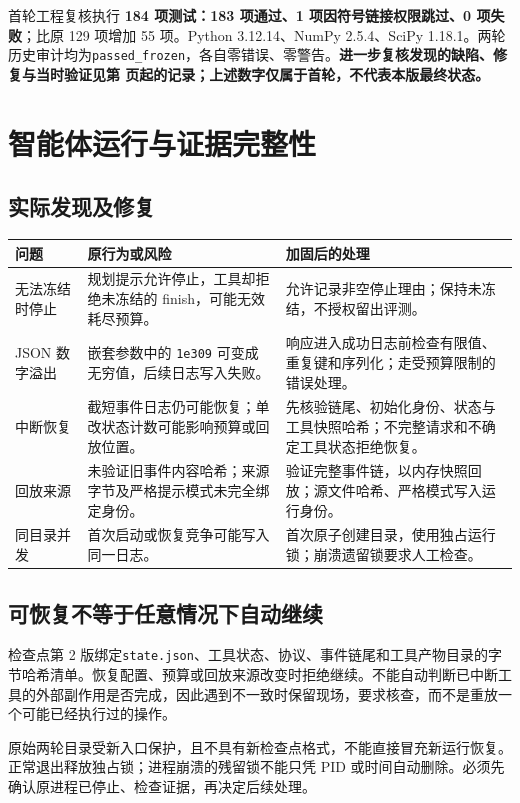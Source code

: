 \documentclass[UTF8,a4paper,zihao=-4,fontset=none]{ctexart}
\newcommand{\code}[1]{{\small\nolinkurl{#1}}}
\begin{document}
首轮工程复核执行 \textbf{184 项测试：183 项通过、1 项因符号链接权限跳过、0 项失败}；比原 129 项增加 55 项。Python 3.12.14、NumPy 2.5.4、SciPy 1.18.1。两轮历史审计均为\code{passed_frozen}，各自零错误、零警告。\textbf{进一步复核发现的缺陷、修复与当时验证见第 \pageref{sec:followup} 页起的记录；上述数字仅属于首轮，不代表本版最终状态。}

\newpage
\section{智能体运行与证据完整性}
\subsection{实际发现及修复}
\noindent\begin{tabularx}{\textwidth}{@{}p{30mm}YY@{}}
\toprule
问题 & 原行为或风险 & 加固后的处理 \\
\midrule
无法冻结时停止 & 规划提示允许停止，工具却拒绝未冻结的 finish，可能无效耗尽预算。 & 允许记录非空停止理由；保持未冻结，不授权留出评测。 \\[4pt]
JSON 数字溢出 & 嵌套参数中的 \code{1e309} 可变成无穷值，后续日志写入失败。 & 响应进入成功日志前检查有限值、重复键和序列化；走受预算限制的错误处理。 \\[4pt]
中断恢复 & 截短事件日志仍可能恢复；单改状态计数可能影响预算或回放位置。 & 先核验链尾、初始化身份、状态与工具快照哈希；不完整请求和不确定工具状态拒绝恢复。 \\[4pt]
回放来源 & 未验证旧事件内容哈希；来源字节及严格提示模式未完全绑定身份。 & 验证完整事件链，以内存快照回放；源文件哈希、严格模式写入运行身份。 \\[4pt]
同目录并发 & 首次启动或恢复竞争可能写入同一日志。 & 首次原子创建目录，使用独占运行锁；崩溃遗留锁要求人工检查。 \\
\bottomrule
\end{tabularx}

\subsection{可恢复不等于任意情况下自动继续}
检查点第 2 版绑定\code{state.json}、工具状态、协议、事件链尾和工具产物目录的字节哈希清单。恢复配置、预算或回放来源改变时拒绝继续。不能自动判断已中断工具的外部副作用是否完成，因此遇到不一致时保留现场，要求核查，而不是重放一个可能已经执行过的操作。

原始两轮目录受新入口保护，且不具有新检查点格式，不能直接冒充新运行恢复。正常退出释放独占锁；进程崩溃的残留锁不能只凭 PID 或时间自动删除。必须先确认原进程已停止、检查证据，再决定后续处理。
\end{document}
